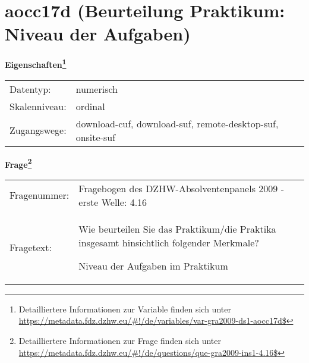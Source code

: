 
    \setcounter{footnote}{0}

    \vspace*{-1.8cm}
	\section{aocc17d (Beurteilung Praktikum: Niveau der Aufgaben)}
	\label{section:aocc17d}



    \vspace*{0.5cm}
    \noindent\textbf{Eigenschaften\footnote{Detailliertere Informationen zur Variable finden sich unter
		\url{https://metadata.fdz.dzhw.eu/\#!/de/variables/var-gra2009-ds1-aocc17d$}}}\\
	\begin{tabularx}{\hsize}{@{}lX}
	Datentyp: & numerisch \\
	Skalenniveau: & ordinal \\
	Zugangswege: &
	  download-cuf, 
	  download-suf, 
	  remote-desktop-suf, 
	  onsite-suf
 \\
    \end{tabularx}



				\vspace*{0.5cm}
                \noindent\textbf{Frage\footnote{Detailliertere Informationen zur Frage finden sich unter
		              \url{https://metadata.fdz.dzhw.eu/\#!/de/questions/que-gra2009-ins1-4.16$}}}\\
				\begin{tabularx}{\hsize}{@{}lX}
					Fragenummer: &
					  Fragebogen des DZHW-Absolventenpanels 2009 - erste Welle:
					  4.16
 \\
					Fragetext: & Wie beurteilen Sie das Praktikum/die Praktika insgesamt hinsichtlich folgender Merkmale?\par  Niveau der Aufgaben im Praktikum \\
				\end{tabularx}






